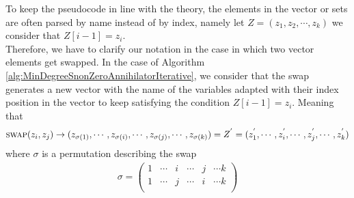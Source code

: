 \documentclass[11pt]{llncs}
\begin{document}
\begin{remark}\label{rem:permutationClarification}
    To keep the pseudocode in line with the theory, the elements in the vector or sets are often parsed by name instead of by index, namely let $Z = (z_1, z_2, \cdots, z_k)$ we consider that $Z[i-1] = z_i$.\\
    Therefore, we have to clarify our notation in the case in which two vector elements get swapped. In the case of Algorithm \ref{alg:MinDegreeSnonZeroAnnihilatorIterative}, we consider that the swap generates a new vector with the name of the variables adapted with their index position in the vector to keep satisfying the condition $Z[i-1] = z_{i}$. Meaning that 
    \begin{align*}
        \mbox{\textsc{swap}}(z_i, z_j) \rightarrow (z_{\sigma(1)}, \cdots, z_{\sigma(i)}, \cdots, z_{\sigma(j)}, \cdots, z_{\sigma(k)}) = Z^{'} = (z^{'}_1, \cdots, z^{'}_i, \cdots, z^{'}_j, \cdots, z^{'}_k)
    \end{align*}
    where $\sigma$ is a permutation describing the swap
    \begin{align*}
        \sigma = \begin{pmatrix}
            1 & \cdots & i & \cdots & j & \cdots k\\
            1 & \cdots & j & \cdots & i & \cdots k\\
        \end{pmatrix}
    \end{align*}
\end{remark}

\end{document}
